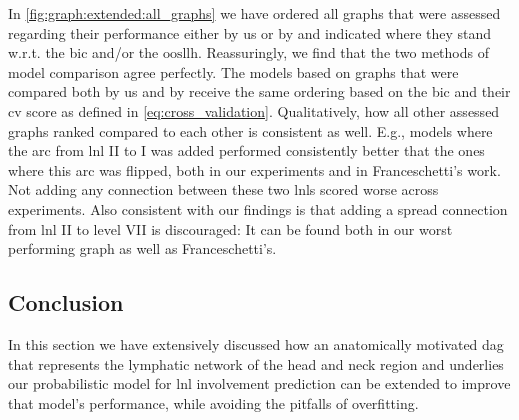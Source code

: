 \documentclass[\relativeRoot/main.tex]{subfiles}
\begin{document}
In \cref{fig:graph:extended:all_graphs} we have ordered all graphs that were assessed regarding their performance either by us or by  and indicated where they stand w.r.t. the \gls{bic} and/or the $\text{oosllh}$. Reassuringly, we find that the two methods of model comparison agree perfectly. The models based on graphs that were compared both by us and by  receive the same ordering based on the \gls{bic} and their \gls{cv} score as defined in \cref{eq:cross_validation}. Qualitatively, how all other assessed graphs ranked compared to each other is consistent as well. E.g., models where the arc from \gls{lnl} II to I was added performed consistently better that the ones where this arc was flipped, both in our experiments and in Franceschetti's work. Not adding any connection between these two \glspl{lnl} scored worse across experiments. Also consistent with our findings is that adding a spread connection from \gls{lnl} II to level VII is discouraged: It can be found both in our worst performing graph as well as Franceschetti's.

\begin{sidewaysfigure}
    \centering
    \def\svgwidth{0.8\textwidth}
    
    \caption[
        All investigated graphs ordered by their performances
    ]{
        Schematics of all investigated graphs modelling the \glspl{lnl} I, II, III, IV, V and VII. The axis at the top indicates the graph's performance w.r.t. the \gls{bic}, while the axis on the bottom shows the $\text{oosllh}$, which was investigated by Franceschetti \cite{franceschetti_comparison_2022}, who only considered graphs adding two connections to the base graph. For both metrics larger values (further to the right) indicate a better performance.
    }
    \label{fig:graph:extended:all_graphs}
\end{sidewaysfigure}

\subsection{Conclusion}
\label{subsec:graph:extended:conclusion}

In this section we have extensively discussed how an anatomically motivated \acrlong{dag} that represents the lymphatic network of the head and neck region and underlies our probabilistic model for \gls{lnl} involvement prediction can be extended to improve that model's performance, while avoiding the pitfalls of overfitting.
\end{document}
